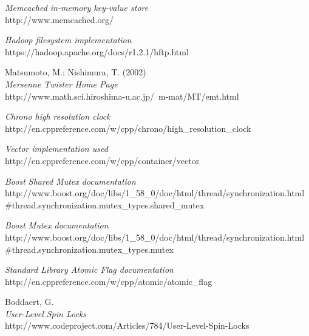 \documentclass[11pt]{report} %
\begin{document}
\begin{thebibliography}{99}
 \emph{Memcached in-memory key-value store}\\
 http://www.memcached.org/

 \emph{Hadoop filesystem implementation}\\
 https://hadoop.apache.org/docs/r1.2.1/hftp.html

 Matsumoto, M.; Nishimura, T. (2002) \\
 \emph{Mersenne Twister Home Page} \\
 http://www.math.sci.hiroshima-u.ac.jp/~m-mat/MT/emt.html

 \emph{Chrono high resolution clock} \\
 http://en.cppreference.com/w/cpp/chrono/high\_resolution\_clock

 \emph{Vector implementation used}\\
 http://en.cppreference.com/w/cpp/container/vector

 \emph{Boost Shared Mutex documentation}\\
 http://www.boost.org/doc/libs/1\_58\_0/doc/html/thread/synchronization.html\#thread.synchronization.mutex\_types.shared\_mutex

 \emph{Boost Mutex documentation}\\
 http://www.boost.org/doc/libs/1\_58\_0/doc/html/thread/synchronization.html\#thread.synchronization.mutex\_types.mutex

 \emph{Standard Library Atomic Flag documentation}\\
 http://en.cppreference.com/w/cpp/atomic/atomic\_flag

 Boddaert, G. \\
 \emph{User-Level Spin Locks} \\
 http://www.codeproject.com/Articles/784/User-Level-Spin-Locks
\end{thebibliography}
\end{document}
